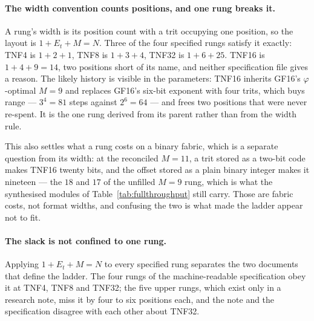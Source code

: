 \documentclass[11pt]{article}
\theoremstyle{definition}
\begin{document}
\paragraph{The width convention counts positions, and one rung breaks it.}
A rung's width is its position count with a trit occupying one position, so the
layout is $1 + E_t + M = N$. Three of the four specified rungs satisfy it exactly:
TNF4 is $1+2+1$, TNF8 is $1+3+4$, TNF32 is $1+6+25$. TNF16 is
$1+4+9 = 14$, two positions short of its name, and neither specification file
gives a reason. The likely history is visible in the parameters: TNF16 inherits
GF16's $\varphi$-optimal $M = 9$ and replaces GF16's six-bit exponent with four
trits, which buys range --- $3^4 = 81$ steps against $2^6 = 64$ --- and frees two
positions that were never re-spent. It is the one rung derived from its parent
rather than from the width rule.

This also settles what a rung costs on a binary fabric, which is a separate
question from its width: at the reconciled $M = 11$, a trit stored as a two-bit
code makes TNF16 twenty bits, and the offset stored as a plain binary integer
makes it nineteen --- the $18$ and $17$ of the unfilled $M = 9$ rung, which is
what the synthesised modules of Table~\ref{tab:fullthroughput} still carry. Those
are fabric costs, not format widths, and confusing the two is what made the
ladder appear not to fit.

\paragraph{The slack is not confined to one rung.} Applying $1 + E_t + M = N$ to
every specified rung separates the two documents that define the ladder. The four
rungs of the machine-readable specification obey it at TNF4, TNF8 and TNF32;
the five upper rungs, which exist only in a research note, miss it by four to six
positions each, and the note and the specification disagree with each other about
TNF32.
\end{document}
